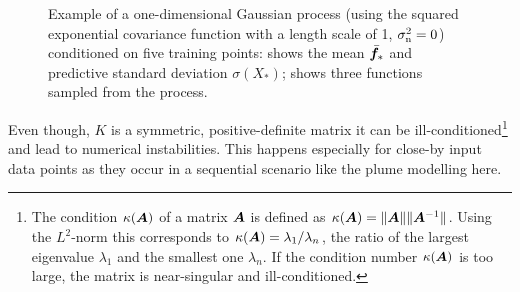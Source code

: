\begin{figure}
    \centering
    \caption[Gaussian process example]{Example of a one-dimensional Gaussian 
        process (using the squared exponential covariance function with 
        a length scale of 1, $\sigma_{\mathrm{n}}^2 = 0$) conditioned on five training 
        points:  shows the mean $\bar{\bm{f}_*}$ and predictive 
        standard deviation $\sigma(X_*)$;  shows three 
        functions sampled from the process.}\label{fig:ex-gp-main}
\end{figure}

Even though, $K$ is a symmetric, positive-definite matrix it can be 
ill-conditioned\footnote{The condition $\kappa(\bm{A})$ of a matrix $\bm{A}$ is 
    defined as $\kappa(\bm{A}) = \|\bm{A}\| \|\bm{A}^{-1}\|$. Using the 
    $L^2$-norm this corresponds to $\kappa(\bm{A}) = \lambda_1/\lambda_n$,
    the ratio of the largest eigenvalue $\lambda_1$ and the smallest one
    $\lambda_n$. If the condition number $\kappa(\bm{A})$ is too large, the 
    matrix is near-singular and ill-conditioned.} and lead to numerical 
instabilities. This happens especially for close-by input data points as they 
occur in a sequential scenario like the plume modelling here.

